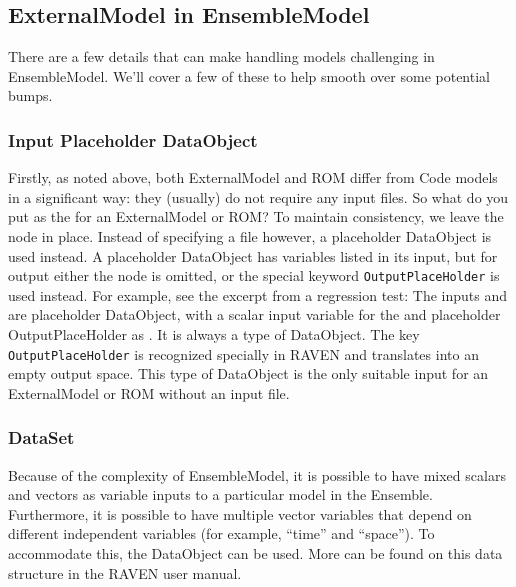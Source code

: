 \subsection{ExternalModel in EnsembleModel}
There are a few details that can make handling  models challenging in EnsembleModel.
We'll cover a few of these to help smooth over some potential bumps.

\subsubsection{Input Placeholder DataObject}
Firstly, as noted above, both ExternalModel and ROM differ from Code models in a significant way: they
(usually) do not require any input files.  So what do you put as the  for an ExternalModel or
ROM?  To maintain consistency, we leave the  node in place.  Instead of specifying a file
however, a
placeholder DataObject is used instead.  A placeholder DataObject has variables listed in its input, but
for output either the  node is omitted, or the special keyword \texttt{OutputPlaceHolder} is used
instead.  For example, see the excerpt from a regression test:
The inputs  and  are placeholder DataObject, with a scalar input
variable for the  and placeholder OutputPlaceHolder as .  It is always a
 type of DataObject.  The key
\texttt{OutputPlaceHolder} is recognized specially in RAVEN and translates into an empty output space.  This
type of DataObject is the only suitable input for an ExternalModel or ROM without an input file.

\subsubsection{DataSet}
Because of the complexity of EnsembleModel, it is possible to have mixed scalars and vectors as variable
inputs to a particular model in the Ensemble.  Furthermore, it is possible to have multiple vector variables
that depend on different independent variables (for example, ``time'' and ``space'').  To accommodate this,
the  DataObject can be used.  More can be found on this data structure in the RAVEN user
manual. %

